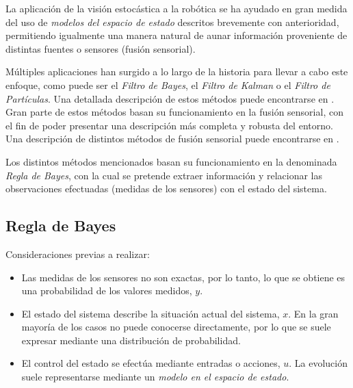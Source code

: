 La aplicación de la visión estocástica a la robótica se ha ayudado en gran medida del uso de \emph{modelos del espacio de estado} descritos brevemente con anterioridad, permitiendo igualmente una manera natural de aunar información proveniente de distintas fuentes o sensores (fusión sensorial). \par 

Múltiples aplicaciones han surgido a lo largo de la historia para llevar a cabo este enfoque, como puede ser el \emph{Filtro de Bayes}, el \emph{Filtro de Kalman} o el \emph{Filtro de Partículas}. Una detallada descripción de estos métodos puede encontrarse en \cite{thrun2005probabilistic}. Gran parte de estos métodos basan su funcionamiento en la fusión sensorial, con el fin de poder presentar una descripción más completa y robusta del entorno. Una descripción de distintos métodos de fusión sensorial puede encontrarse en \cite{siciliano2008springer}. \par 

Los distintos métodos mencionados basan su funcionamiento en la denominada \emph{Regla de Bayes}, con la cual se pretende extraer información y relacionar las observaciones efectuadas (medidas de los sensores) con el estado del sistema. \par 

\subsection{Regla de Bayes}

\noindent
Consideraciones previas a realizar:

\begin{itemize}

\item Las medidas de los sensores no son exactas, por lo tanto, lo que se obtiene es una probabilidad de los valores medidos, $y$. \par 

\item El estado del sistema describe la situación actual del sistema, $x$. En la gran mayoría de los casos no puede conocerse directamente, por lo que se suele expresar mediante una distribución de probabilidad. \par 

\item El control del estado se efectúa mediante entradas o acciones, $u$. La evolución suele representarse mediante un \emph{modelo en el espacio de estado}. \par 

\end{itemize}


